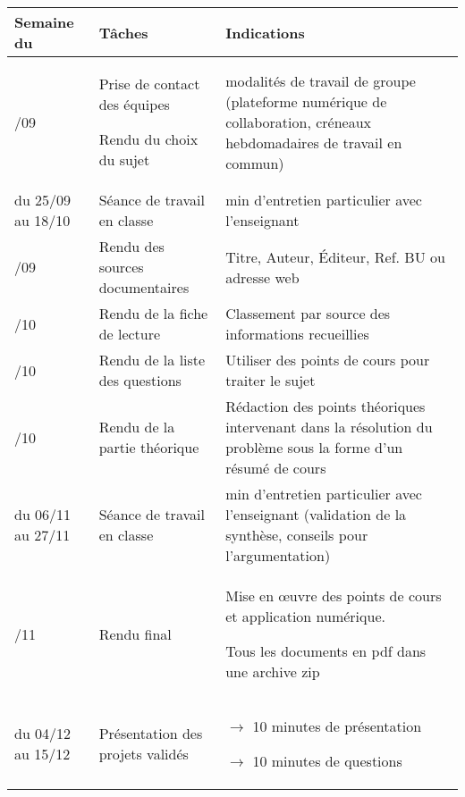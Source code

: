 \begin{center}
\begin{tabular}{|p{}|p{}|p{}|}
\hline
\size Semaine du	& \size Tâches						& \size Indications\\
\hline
\hline
\size 11/09				& \size Prise de contact des équipes \par Rendu du choix du sujet	& \size modalités de travail de groupe (plateforme numérique de collaboration, créneaux hebdomadaires de travail en commun)\\
\hline
\size du 25/09 au 18/10	& \size Séance de travail en classe 	& \size 30 min d'entretien particulier avec l'enseignant\e \\
\hline
\size 25/09		& \size Rendu des sources documentaires 		& \size Titre, Auteur, Éditeur, Ref. BU ou adresse web \\
\hline
\size 02/10		& \size Rendu de la fiche de lecture	& \size Classement par source des informations recueillies \\
\hline
\size 16/10		& \size Rendu de la liste des questions	& \size Utiliser des points de cours  pour traiter le sujet \\
\hline
\size 30/10		& \size Rendu de la partie théorique	& \size Rédaction des points théoriques intervenant dans la résolution du problème sous la forme d'un résumé de cours \\	\hline
\size du 06/11 au 27/11	& \size Séance de travail en classe 	& \size 30 min d'entretien particulier avec l'enseignant (validation de la synthèse, conseils pour l'argumentation)\\
\hline
\size 27/11		& \size Rendu final & \size Mise en \oe uvre des points de cours et application numérique. \par Tous les documents en pdf dans une archive zip \\
\hline
\size du 04/12 au 15/12 & \size Présentation des projets validés & \size $\rightarrow$ 10 minutes de présentation \par $\rightarrow$ 10 minutes de questions\\
\hline
\end{tabular}
\end{center}
